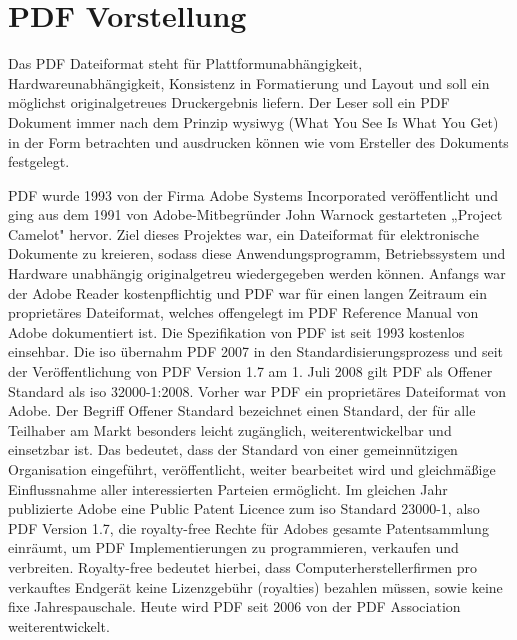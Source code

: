 \section{PDF Vorstellung}
Das PDF Dateiformat steht für Plattformunabhängigkeit, Hardwareunabhängigkeit, Konsistenz in Formatierung und Layout und soll ein möglichst originalgetreues Druckergebnis liefern. Der Leser soll ein PDF Dokument immer nach dem Prinzip \gls{wysiwyg} (What You See Is What You Get) in der Form betrachten und ausdrucken können wie vom Ersteller des Dokuments festgelegt.
\par
PDF wurde 1993 von der Firma Adobe Systems Incorporated veröffentlicht und ging aus dem 1991 von Adobe-Mitbegründer John Warnock gestarteten „Project Camelot" hervor. Ziel dieses Projektes war, ein Dateiformat für elektronische Dokumente zu kreieren, sodass diese Anwendungsprogramm, Betriebssystem und Hardware unabhängig originalgetreu wiedergegeben werden können. \cite{scheeberger,wiki-pdf-de} Anfangs war der Adobe Reader kostenpflichtig und PDF war für einen langen Zeitraum ein proprietäres Dateiformat, welches offengelegt im PDF Reference Manual von Adobe dokumentiert ist. Die Spezifikation von PDF ist seit 1993 kostenlos einsehbar. \cite{wiki-pdf-engl} Die \gls{iso} übernahm PDF 2007 in den Standardisierungsprozess und seit der Veröffentlichung von PDF Version 1.7 am 1. Juli 2008 gilt PDF als Offener Standard als \gls{iso} 32000-1:2008. \cite{wiki-pdf-de, wiki-pdf-engl} Vorher war PDF ein proprietäres Dateiformat von Adobe. Der Begriff Offener Standard bezeichnet einen Standard, der für alle Teilhaber am Markt besonders leicht zugänglich, weiterentwickelbar und einsetzbar ist. Das bedeutet, dass der Standard von einer gemeinnützigen Organisation eingeführt, veröffentlicht, weiter bearbeitet wird und gleichmäßige Einflussnahme aller interessierten Parteien ermöglicht. \cite{wiki-standard} Im gleichen Jahr publizierte Adobe eine Public Patent Licence zum \gls{iso} Standard 23000-1, also PDF Version 1.7, die royalty-free Rechte für Adobes gesamte Patentsammlung einräumt, um PDF Implementierungen zu programmieren, verkaufen und verbreiten. \cite{wiki-pdf-engl} Royalty-free bedeutet hierbei, dass Computerherstellerfirmen pro verkauftes Endgerät keine Lizenzgebühr (royalties) bezahlen müssen, sowie keine fixe Jahrespauschale. \cite{wiki-roy-free} Heute wird PDF seit 2006 von der PDF Association weiterentwickelt. \cite{wiki-pdf-de}
